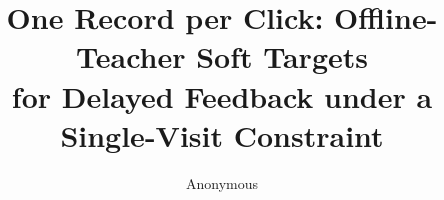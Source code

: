 \documentclass[runningheads]{llncs}
\begin{document}
\title{One Record per Click: Offline-Teacher Soft Targets\\for Delayed Feedback under a
       Single-Visit Constraint}

\author{Anonymous}

\maketitle

\begin{abstract}

\end{abstract}











\end{document}
